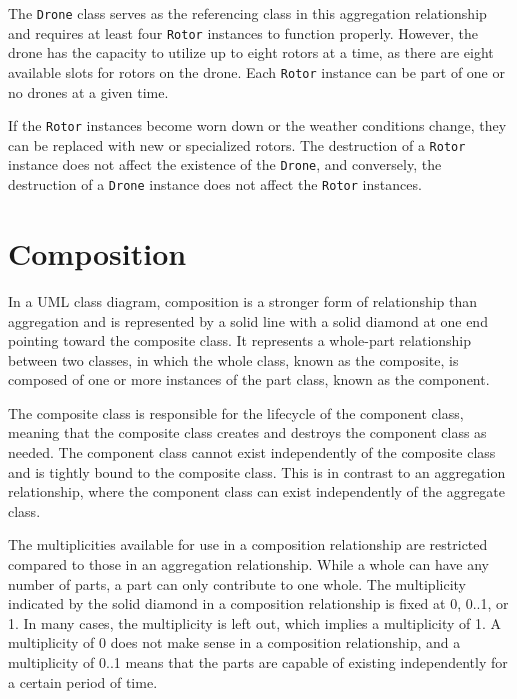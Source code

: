 \documentclass[
	12pt,
    a4paper,
    egregdoesnotlikesansseriftitles, %
    toc=chapterentrywithdots,
    oneside, openany,
    titlepage,
    parskip=half,
    headings=normal,  %
    listof=totoc,
    bibliography=totocnumbered,
    index=totoc,
    captions=tableheading,  %
    listof=flat,
    numbers=noenddot, %
    final]
    {scrbook}
\begin{document}
The \texttt{Drone} class serves as the referencing class in this aggregation relationship and requires at least four \texttt{Rotor} instances to function properly. 
However, the drone has the capacity to utilize up to eight rotors at a time, as there are eight available slots for rotors on the drone. 
Each \texttt{Rotor} instance can be part of one or no drones at a given time.

If the \texttt{Rotor} instances become worn down or the weather conditions change, they can be replaced with new or specialized rotors. 
The destruction of a \texttt{Rotor} instance does not affect the existence of the \texttt{Drone}, and conversely, the destruction of a \texttt{Drone} instance does not affect the \texttt{Rotor} instances.


\section{Composition}

In a UML class diagram, composition is a stronger form of relationship than aggregation and is represented by a solid line with a solid diamond at one end pointing toward the composite class. It represents a whole-part relationship between two classes, in which the whole class, known as the composite, is composed of one or more instances of the part class, known as the component.

The composite class is responsible for the lifecycle of the component class, meaning that the composite class creates and destroys the component class as needed. The component class cannot exist independently of the composite class and is tightly bound to the composite class. This is in contrast to an aggregation relationship, where the component class can exist independently of the aggregate class.

The multiplicities available for use in a composition relationship are restricted compared to those in an aggregation relationship. While a whole can have any number of parts, a part can only contribute to one whole. The multiplicity indicated by the solid diamond in a composition relationship is fixed at 0, 0..1, or 1. In many cases, the multiplicity is left out, which implies a multiplicity of 1. A multiplicity of 0 does not make sense in a composition relationship, and a multiplicity of 0..1 means that the parts are capable of existing independently for a certain period of time.
 \cite[p. 153-154]{uml}
\end{document}
